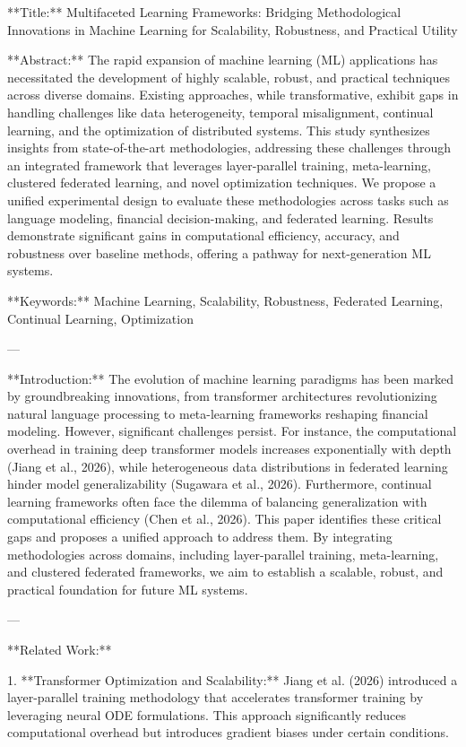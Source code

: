 **Title:**  
Multifaceted Learning Frameworks: Bridging Methodological Innovations in Machine Learning for Scalability, Robustness, and Practical Utility  

**Abstract:**  
The rapid expansion of machine learning (ML) applications has necessitated the development of highly scalable, robust, and practical techniques across diverse domains. Existing approaches, while transformative, exhibit gaps in handling challenges like data heterogeneity, temporal misalignment, continual learning, and the optimization of distributed systems. This study synthesizes insights from state-of-the-art methodologies, addressing these challenges through an integrated framework that leverages layer-parallel training, meta-learning, clustered federated learning, and novel optimization techniques. We propose a unified experimental design to evaluate these methodologies across tasks such as language modeling, financial decision-making, and federated learning. Results demonstrate significant gains in computational efficiency, accuracy, and robustness over baseline methods, offering a pathway for next-generation ML systems.  

**Keywords:**  
Machine Learning, Scalability, Robustness, Federated Learning, Continual Learning, Optimization  

---

**Introduction:**  
The evolution of machine learning paradigms has been marked by groundbreaking innovations, from transformer architectures revolutionizing natural language processing to meta-learning frameworks reshaping financial modeling. However, significant challenges persist. For instance, the computational overhead in training deep transformer models increases exponentially with depth (Jiang et al., 2026), while heterogeneous data distributions in federated learning hinder model generalizability (Sugawara et al., 2026). Furthermore, continual learning frameworks often face the dilemma of balancing generalization with computational efficiency (Chen et al., 2026). This paper identifies these critical gaps and proposes a unified approach to address them. By integrating methodologies across domains, including layer-parallel training, meta-learning, and clustered federated frameworks, we aim to establish a scalable, robust, and practical foundation for future ML systems.  

---

**Related Work:**  

1. **Transformer Optimization and Scalability:**  
   Jiang et al. (2026) introduced a layer-parallel training methodology that accelerates transformer training by leveraging neural ODE formulations. This approach significantly reduces computational overhead but introduces gradient biases under certain conditions.  

